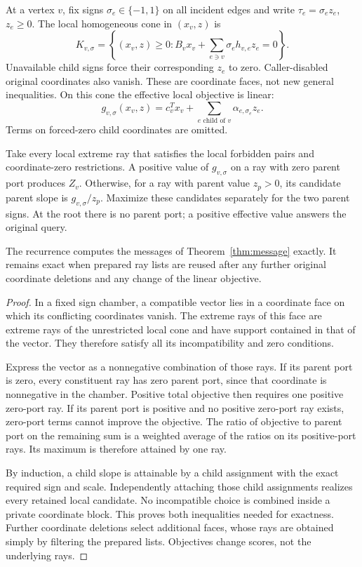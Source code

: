 At a vertex $v$, fix signs $\sigma_e\in\{-1,1\}$ on all incident edges and
write $\tau_e=\sigma_e z_e$, $z_e\geq0$. The local homogeneous cone in
$(x_v,z)$ is
\[
 K_{v,\sigma}=\left\{(x_v,z)\geq0:
 B_vx_v+\sum_{e\ni v}\sigma_e h_{v,e}z_e=0\right\}.
\]
Unavailable child signs force their corresponding $z_e$ to zero. Caller-disabled
original coordinates also vanish. These are coordinate faces, not new general
inequalities. On this cone the effective local objective is linear:
\begin{equation}\label{eq:effective}
 g_{v,\sigma}(x_v,z)=c_v^Tx_v+
 \sum_{e\text{ child of }v}\alpha_{e,\sigma_e}z_e.
\end{equation}
Terms on forced-zero child coordinates are omitted.

Take every local extreme ray that satisfies the local forbidden pairs and
coordinate-zero restrictions. A positive value of $g_{v,\sigma}$ on a ray with
zero parent port produces $Z_v$. Otherwise, for a ray with parent value $z_p>0$,
its candidate parent slope is $g_{v,\sigma}/z_p$. Maximize these candidates
separately for the two parent signs. At the root there is no parent port;
a positive effective value answers the original query.

\begin{proposition}
\label{prop:recurrence}
The recurrence computes the messages of Theorem~\ref{thm:message} exactly.
It remains exact when prepared ray lists are reused after any further original
coordinate deletions and any change of the linear objective.
\end{proposition}

\begin{proof}
In a fixed sign chamber, a compatible vector lies in a coordinate face on which
its conflicting coordinates vanish. The extreme rays of this face are extreme
rays of the unrestricted local cone and have support contained in that of the
vector. They therefore satisfy all its incompatibility and zero conditions.

Express the vector as a nonnegative combination of those rays. If its parent
port is zero, every constituent ray has zero parent port, since that coordinate
is nonnegative in the chamber. Positive total objective then requires one
positive zero-port ray. If its parent port is positive and no positive
zero-port ray exists, zero-port terms cannot improve the objective. The ratio
of objective to parent port on the remaining sum is a weighted average of the
ratios on its positive-port rays. Its maximum is therefore attained by one ray.

By induction, a child slope is attainable by a child assignment with the exact
required sign and scale. Independently attaching those child assignments
realizes every retained local candidate. No incompatible choice is combined
inside a private coordinate block. This proves both inequalities needed for
exactness. Further coordinate deletions select additional faces, whose rays
are obtained simply by filtering the prepared lists. Objectives change scores,
not the underlying rays.
\end{proof}

